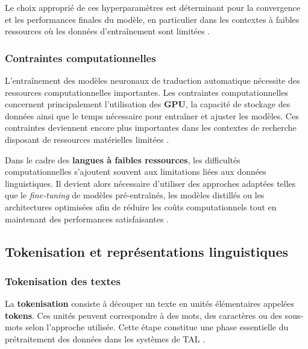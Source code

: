 Le choix approprié de ces hyperparamètres est déterminant pour la convergence et les performances finales du modèle, en particulier dans les contextes à faibles ressources où les données d'entraînement sont limitées \cite{rakhimov2024enhancing}.

\subsubsection{Contraintes computationnelles}

L'entraînement des modèles neuronaux de traduction automatique nécessite des ressources computationnelles importantes. Les contraintes computationnelles concernent principalement l'utilisation des \textbf{\ac{GPU}}, la capacité de stockage des données ainsi que le temps nécessaire pour entraîner et ajuster les modèles. Ces contraintes deviennent encore plus importantes dans les contextes de recherche disposant de ressources matérielles limitées \cite{Goodfellow-et-al-2016}.

Dans le cadre des \textbf{langues à faibles ressources}, les difficultés computationnelles s'ajoutent souvent aux limitations liées aux données linguistiques. Il devient alors nécessaire d'utiliser des approches adaptées telles que le \textit{fine-tuning} de modèles pré-entraînés, les modèles distillés ou les architectures optimisées afin de réduire les coûts computationnels tout en maintenant des performances satisfaisantes \cite{agyei2025dynamic}.

\subsection{Tokenisation et représentations linguistiques}

\subsubsection{Tokenisation des textes}

La \textbf{tokenisation} consiste à découper un texte en unités élémentaires appelées \textbf{tokens}. Ces unités peuvent correspondre à des mots, des caractères ou des sous-mots selon l'approche utilisée. Cette étape constitue une phase essentielle du prétraitement des données dans les systèmes de \ac{TAL} \cite{ranathunga2023neural}.

